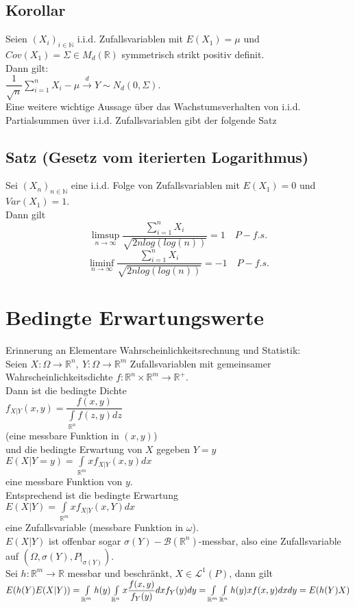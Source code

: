 \documentclass[german,10pt,oneside, fleqn, a4paper]{article}
\newcommand {\R}	{\mathbb{R}}
\newcommand {\N}	{\mathbb{N}}
\newcommand{\ra}{\rightarrow}
\newcommand{\lsup}[1][n]{\limsup\limits_{#1\rightarrow\infty}}
\newcommand{\linf}[1][n]{\liminf\limits_{#1\rightarrow\infty}}
\newcommand{\sm}[2][\infty]{\sum\limits_{#2}^{#1}}
\newcommand{\folge}[3][\N]{\left(#2_#3\right)_{#3\in #1}}
\newcommand{\mc}[1]{\mathcal{#1}}
\newcommand{\lp}[1]{\mc{L}^{#1}}
\newcommand{\1}[1]{1_{#1}}
\newcommand{\2}[1]{\1{\brac{#1}}}
\newcommand{\xr}[2][]{\xrightarrow[#1]{#2}}
\begin{document}
\subsection{Korollar}
\label{5.12}
Seien $\folge{X}{i}$ i.i.d. Zufallsvariablen mit $E(X_1)=\mu$ und $Cov(X_1)=\Sigma\in M_d(\R)$ symmetrisch strikt positiv definit.\\
Dann gilt:\\
$\dfrac{1}{\sqrt{n}}\sm[n]{i=1}{X_i-\mu}\xr{d}Y\sim N_d(0,\Sigma).$\\
Eine weitere wichtige Aussage über das Wachstumsverhalten von i.i.d. Partialsummen üver i.i.d. Zufallsvariablen gibt der folgende Satz

\subsection{Satz (Gesetz vom iterierten Logarithmus)}
\label{5.13}
Sei $\folge{X}{n}$ eine i.i.d. Folge von Zufallsvariablen mit $E(X_1)=0$ und $Var(X_1)=1$.\\
Dann gilt
\[\lsup\dfrac{\sm[n]{i=1}X_i}{\sqrt{2nlog(log(n))}}=1\quad P-f.s.\]
\[\linf\dfrac{\sm[n]{i=1}X_i}{\sqrt{2nlog(log(n))}}=-1\quad P-f.s.\]







\section{Bedingte Erwartungswerte}
Erinnerung an Elementare Wahrscheinlichkeitsrechnung und Statistik:\\
Seien $X:\Omega\ra\R^n,\ Y:\Omega\ra\R^m$ Zufallsvariablen mit gemeinsamer Wahrscheinlichkeitsdichte $f:\R^n\times\R^m\ra\R^+$.\\
Dann ist die bedingte Dichte\\
$f_{X|Y}(x,y)=\dfrac{f(x,y)}{\int\limits_{\R^n}f(z,y)dz}$\\
(eine messbare Funktion in $(x,y)$)\\
und die bedingte Erwartung von $X$ gegeben $Y=y$\\
$E(X|Y=y)=\int\limits_{\R^m}xf_{X|Y}(x,y)dx$\\
eine messbare Funktion von $y$.\\
Entsprechend ist die bedingte Erwartung \\
$E(X|Y)=\int\limits_{\R^m}xf_{X|Y}(x,Y)dx$\\
eine Zufallsvariable (messbare Funktion in $\omega$).\\
$E(X|Y)$ ist offenbar sogar $\sigma(Y)-\mc{B}(\R^n)$-messbar, also eine Zufallsvariable auf $(\Omega,\sigma(Y),P|_{\sigma(Y)})$.\\
Sei $h:\R^m\ra\R$ messbar und beschränkt, $X\in\lp{1}(P)$, dann gilt\\
$E(h(Y)E(X|Y))=\int\limits_{\R^m}h(y)\int\limits_{\R^n}x\dfrac{f(x,y)}{f_Y(y)}dxf_Y(y)dy\\
=\int\limits_{\R^m}\int\limits_{\R^n}h(y)xf(x,y)dxdy=E(h(Y)X)$
\end{document}
